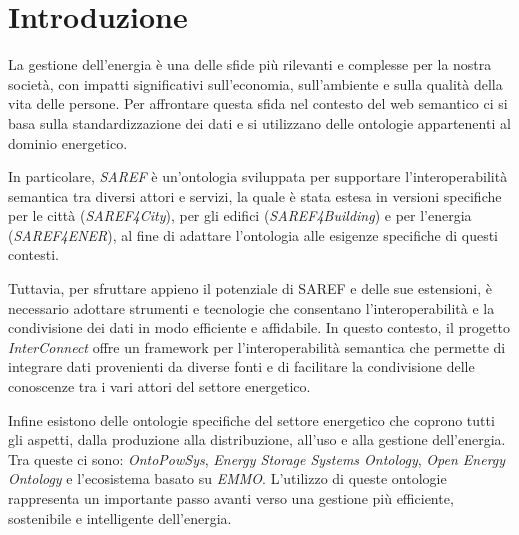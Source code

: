 \chapter{Introduzione}

La gestione dell'energia è una delle sfide più rilevanti e complesse per la nostra società, con impatti significativi sull'economia, sull'ambiente e sulla qualità della vita delle persone. Per affrontare questa sfida nel contesto del web semantico ci si basa sulla standardizzazione dei dati e si utilizzano delle ontologie appartenenti al dominio energetico.

In particolare, \textit{SAREF} è un’ontologia sviluppata per supportare l’interoperabilità semantica tra diversi attori e servizi, la quale è stata estesa in versioni specifiche per le città (\textit{SAREF4City}), per gli edifici (\textit{SAREF4Building}) e per l'energia (\textit{SAREF4ENER}), al fine di adattare l'ontologia alle esigenze specifiche di questi contesti.

Tuttavia, per sfruttare appieno il potenziale di SAREF e delle sue estensioni, è necessario adottare strumenti e tecnologie che consentano l'interoperabilità e la condivisione dei dati in modo efficiente e affidabile. In questo contesto, il progetto \textit{InterConnect} offre un framework per l'interoperabilità semantica che permette di integrare dati provenienti da diverse fonti e di facilitare la condivisione delle conoscenze tra i vari attori del settore energetico.

Infine esistono delle ontologie specifiche del settore energetico che coprono tutti gli aspetti, dalla produzione alla distribuzione, all'uso e alla gestione dell'energia. Tra queste ci sono: \textit{OntoPowSys}, \textit{Energy Storage Systems Ontology},
\textit{Open Energy Ontology} e l'ecosistema basato su \textit{EMMO}.
L'utilizzo di queste ontologie rappresenta un importante passo avanti verso una gestione più efficiente, sostenibile e intelligente dell'energia.


